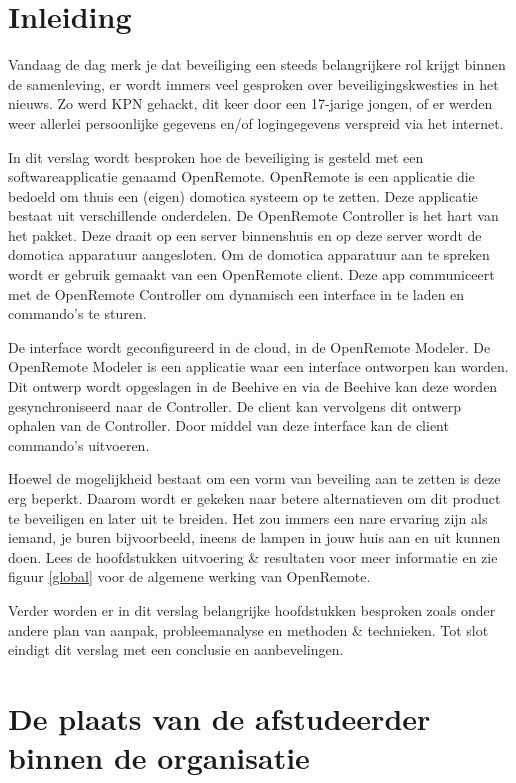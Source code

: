 \documentclass[]{article}
\begin{document}
\newpage
\section{Inleiding}
Vandaag de dag merk je dat beveiliging een steeds belangrijkere rol krijgt binnen
de samenleving, er wordt immers veel gesproken over beveiligingskwesties in
het nieuws. Zo werd KPN gehackt, dit keer door een 17-jarige jongen, of
er werden weer allerlei persoonlijke gegevens en/of logingegevens verspreid via het
internet.

In dit verslag wordt besproken hoe de beveiliging is gesteld met een
softwareapplicatie genaamd OpenRemote. OpenRemote is een applicatie die
bedoeld om thuis een (eigen) domotica systeem op te zetten. Deze applicatie
bestaat uit verschillende onderdelen. De OpenRemote Controller is het hart van
het pakket. Deze draait op een server binnenshuis en op deze server wordt de
domotica apparatuur aangesloten. Om de domotica apparatuur aan te spreken wordt
er gebruik gemaakt van een OpenRemote client. Deze app communiceert met de
OpenRemote Controller om dynamisch een interface in te laden en commando's te
sturen. 

De interface wordt geconfigureerd in de cloud, in de OpenRemote Modeler. De
OpenRemote Modeler is een applicatie waar een interface ontworpen kan worden.
Dit ontwerp wordt opgeslagen in de Beehive en via de Beehive kan deze worden
gesynchroniseerd naar de Controller. De client kan vervolgens dit ontwerp
ophalen van de Controller. Door middel van deze interface kan de client
commando's uitvoeren. 

Hoewel de mogelijkheid bestaat om een vorm van beveiling aan te zetten is deze
erg beperkt. Daarom wordt er gekeken naar betere alternatieven om dit product te
beveiligen en later uit te breiden. Het zou immers een nare ervaring zijn als
iemand, je buren bijvoorbeeld, ineens de lampen in jouw huis aan en uit kunnen
doen. Lees de hoofdstukken uitvoering \& resultaten voor meer informatie en zie
figuur \ref{global} voor de algemene werking van OpenRemote.

Verder worden er in dit verslag belangrijke hoofdstukken besproken zoals onder andere
plan van aanpak, probleemanalyse en methoden \& technieken.
Tot slot eindigt dit verslag met een conclusie en aanbevelingen.

\newpage
\section{De plaats van de afstudeerder binnen de organisatie}
\end{document}
